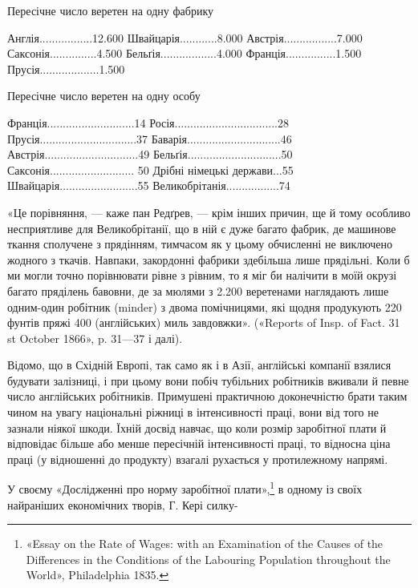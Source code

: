 Пересічне число веретен на одну фабрику

Англія.................12.600
Швайцарія............8.000
Австрія.................7.000
Саксонія...............4.500
Бельґія..................4.000
Франція................1.500
Прусія...................1.500

Пересічне число веретен на одну особу

Франція............................14
Росія.................................28
Прусія...............................37
Баварія..............................46
Австрія..............................49
Бельґія..............................50
Саксонія........................... 50
Дрібні німецькі держави...55
Швайцарія.........................55
Великобрітанія.................74

«Це порівняння, — каже пан Редґрев, — крім інших причин, ще й тому особливо несприятливе для
Великобрітанії, що в ній є дуже багато фабрик, де машинове ткання сполучене з прядінням, тимчасом як
у цьому обчисленні не виключено жодного з ткачів. Навпаки, закордонні фабрики здебільша лише
прядільні. Коли б ми могли точно порівнювати рівне з рівним, то я міг би налічити в моїй окрузі
багато пряділень бавовни, де за мюлями з 2.200 веретенами наглядають лише одним-один робітник
(minder) з двома помічницями, які щодня продукують 220 фунтів пряжі 400 (англійських) миль
завдовжки». («Reports of Insp. of Fact. 31 st October 1866», p. 31—37 і далі).

Відомо, що в Східній Европі, так само як і в Азії, англійські компанії взялися будувати залізниці, і
при цьому вони побіч тубільних робітників вживали й певне число англійських робітників. Примушені
практичною доконечністю брати таким чином
на увагу національні ріжниці в інтенсивності праці, вони від того не зазнали ніякої шкоди. Їхній
досвід навчає, що коли розмір заробітної плати й відповідає більше або менше пересічній
інтенсивності праці, то відносна ціна праці (у відношенні до продукту) взагалі рухається у
протилежному напрямі.

У своєму «Дослідженні про норму заробітної плати»,\footnote{
«Essay on the Rate of Wages: with an Examination of the Causes
of the Differences in the Conditions of the Labouring Population throughout
the World», Philadelphia 1835.
} в одному із своїх найраніших економічних
творів, Г. Кері силку-

